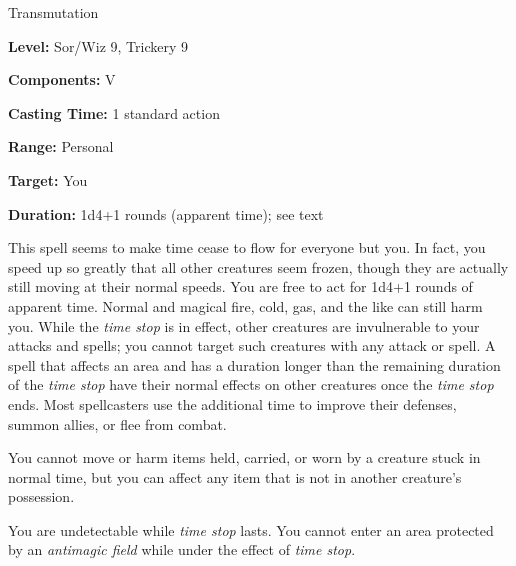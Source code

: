 
Transmutation

\textbf{Level:} Sor/Wiz 9, Trickery 9

\textbf{Components:} V

\textbf{Casting Time:} 1 standard action

\textbf{Range:} Personal

\textbf{Target:} You

\textbf{Duration:} 1d4+1 rounds (apparent time); see text

This spell seems to make time cease to flow for everyone but you. In fact, you 
speed up so greatly that all other creatures seem frozen, though they are actually 
still moving at their normal speeds. You are free to act for 1d4+1 rounds of apparent 
time. Normal and magical fire, cold, gas, and the like can still harm you. While 
the \textit{time stop} is in effect, other creatures are invulnerable to your attacks 
and spells; you cannot target such creatures with any attack or spell. A spell 
that affects an area and has a duration longer than the remaining duration of the 
\textit{time stop} have their normal effects on other creatures once the \textit{time 
stop} ends. Most spellcasters use the additional time to improve their defenses, 
summon allies, or flee from combat.

You cannot move or harm items held, carried, or worn by a creature stuck in normal 
time, but you can affect any item that is not in another creature's possession.

You are undetectable while \textit{time stop} lasts. You cannot enter an area protected 
by an \textit{antimagic field} while under the effect of \textit{time stop}.

